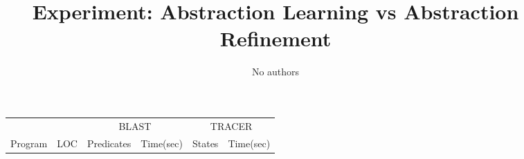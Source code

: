 \setlength{\topmargin}{-.5in}
\setlength{\textheight}{9in}
\setlength{\oddsidemargin}{.125in}
\setlength{\textwidth}{6.25in}

\title{Experiment: Abstraction Learning vs Abstraction Refinement}
\author{No authors}

\maketitle

\begin{figure*}[tbh]
\begin{small}
\begin{center}
\begin{tabular}{|l|r||c|c||c|c|} \hline
       & & \multicolumn{2}{c||}{\textsf{BLAST}} & \multicolumn{2}{c||}{\textsf{TRACER}} \\ \cline{3-6}
\textsf{Program} & \textsf{LOC} & \textsf{Predicates} & \textsf{Time(sec)} 
                                 & \textsf{States} & \textsf{Time(sec)} \\ \hline\hline


\end{tabular}
\end{center}
\end{small}
\end{figure*}
